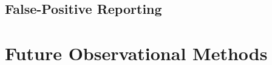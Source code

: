 \documentclass[a4paper,fleqn,usenatbib]{mnras}
\begin{document}
\subsection{False-Positive Reporting}



\section{Future Observational Methods}

%
%
%
\end{document}
